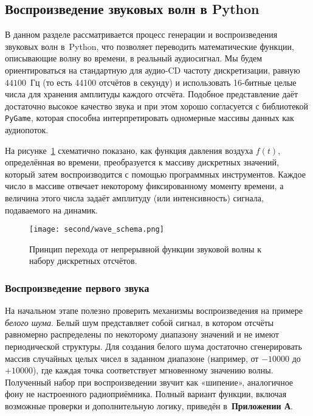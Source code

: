 \documentclass[bachelor, och, diploma]{SCWorks}
\begin{document}
\subsection{Воспроизведение звуковых волн в Python}

В данном разделе рассматривается процесс генерации и воспроизведения звуковых волн в~Python, что позволяет переводить математические функции, описывающие волну во времени, в реальный аудиосигнал. Мы будем ориентироваться на стандартную для аудио-CD частоту дискретизации, равную $44100$~Гц (то есть 44100 отсчётов в секунду) и использовать 16-битные целые числа для хранения амплитуды каждого отсчёта. Подобное представление даёт достаточно высокое качество звука и при этом хорошо согласуется с библиотекой \texttt{PyGame}, которая способна интерпретировать одномерные массивы данных как аудиопоток.

На рисунке~\ref{fig:wave_schema} схематично показано, как функция давления воздуха $f(t)$, определённая во времени, преобразуется к массиву дискретных значений, который затем воспроизводится с помощью программных инструментов. Каждое число в массиве отвечает некоторому фиксированному моменту времени, а величина этого числа задаёт амплитуду (или интенсивность) сигнала, подаваемого на динамик.

\begin{figure}[ht!]
\centering
\texttt{[image: second/wave\_schema.png]}
\caption{Принцип перехода от непрерывной функции звуковой волны к набору дискретных отсчётов.}
\label{fig:wave_schema}
\end{figure}

\subsubsection{Воспроизведение первого звука}
\label{sec:first_sound}

На начальном этапе полезно проверить механизмы воспроизведения на примере \textit{белого шума}. Белый шум представляет собой сигнал, в котором отсчёты равномерно распределены по некоторому диапазону значений и не имеют периодической структуры. Для создания белого шума достаточно сгенерировать массив случайных целых чисел в заданном диапазоне (например, от $-10000$ до $+10000$), где каждая точка соответствует мгновенному значению волны. Полученный набор при воспроизведении звучит как «шипение», аналогичное фону не настроенного радиоприёмника. Полный вариант функции, включая возможные проверки и дополнительную логику, приведён в~\textbf{Приложении А}.
\end{document}
